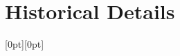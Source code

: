 
\section{Historical Details}
\raisebox{\baselineskip}[0pt][0pt]{}\label{Details}
%
\denseouterlist{%
%
\item[]{%

}}
